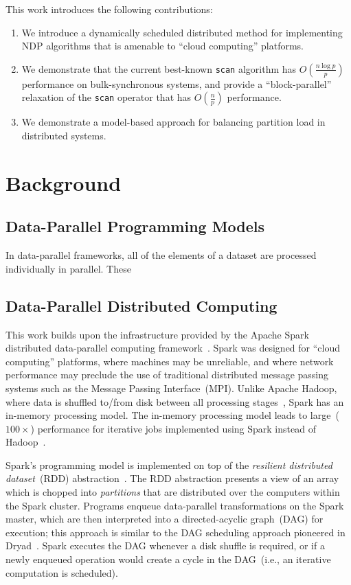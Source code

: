 \documentclass[preprint]{sigplanconf}
\theoremstyle{definition}
\begin{document}
This work introduces the following contributions:

\begin{enumerate}
\item We introduce a dynamically scheduled distributed method for implementing NDP algorithms that is
amenable to ``cloud computing'' platforms.
\item We demonstrate that the current best-known \texttt{scan} algorithm has $O(\frac{n \log p}{p})$
performance on bulk-synchronous systems, and provide a ``block-parallel'' relaxation of the \texttt{scan}
operator that has $O(\frac{n}{p})$ performance.
\item We demonstrate a model-based approach for balancing partition load in distributed systems.
\end{enumerate}

\section{Background}
\label{sec:background}

\subsection{Data-Parallel Programming Models}
\label{sec:data-parallel-programming-models}

In data-parallel frameworks, all of the elements of a dataset are processed individually in parallel. These


\subsection{Data-Parallel Distributed Computing}
\label{sec:data-parallel-distributed-computing}

This work builds upon the infrastructure provided by the Apache Spark distributed data-parallel
computing framework~\cite{spark, zaharia10}. Spark was designed for ``cloud computing'' platforms,
where machines may be unreliable, and where network performance may preclude the use of traditional
distributed message passing systems such as the Message Passing Interface~(MPI). Unlike Apache
Hadoop, where data is shuffled to/from disk between all processing stages~\cite{hadoop, shvachko10},
Spark has an in-memory processing model. The in-memory processing model leads to
large~($100\times$) performance for iterative jobs implemented using Spark instead of
Hadoop~\cite{zaharia10}.

Spark's programming model is implemented on top of the \emph{resilient distributed dataset}~(RDD)
abstraction~\cite{zaharia12}. The RDD abstraction presents a view of an array which is chopped into
\emph{partitions} that are distributed over the computers within the Spark cluster. Programs enqueue
data-parallel transformations on the Spark master, which are then interpreted into a directed-acyclic
graph~(DAG) for execution; this approach is similar to the DAG scheduling approach pioneered in
Dryad~\cite{isard07}. Spark executes the DAG whenever a disk shuffle is required, or if a newly
enqueued operation would create a cycle in the DAG~(i.e., an iterative computation is scheduled).
\end{document}
